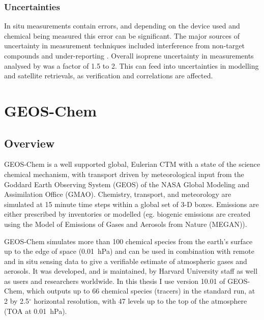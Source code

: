     
    \subsubsection{Uncertainties}
      \label{Model:Datasets:uncertainties}
      
      In situ measurements contain errors, and depending on the device used and chemical being measured this error can be significant.
      The major sources of uncertainty in measurement techniques included interference from non-target compounds and under-reporting \parencite[eg.][]{Dunne2018,Guerette2018}.
      Overall isoprene uncertainty in measurements analysed by \textcite{Dunne2018} was a factor of 1.5 to 2.
      This can feed into uncertainties in modelling and satellite retrievals, as verification and correlations are affected.
    
\section{GEOS-Chem}
  \label{Model:GC}

  \subsection{Overview}
    GEOS-Chem is a well supported global, Eulerian CTM with a state of the science chemical mechanism, with transport driven by meteorological input from the Goddard Earth Observing System (GEOS) of the NASA Global Modeling and Assimilation Office (GMAO).
    Chemistry, transport, and meteorology are simulated at 15 minute time steps within a global set of 3-D boxes.
    Emissions are either prescribed by inventories or modelled (eg. biogenic emissions are created using the Model of Emissions of Gases and Aerosols from Nature (MEGAN)).
    
    GEOS-Chem simulates more than 100 chemical species from the earth's surface up to the edge of space (0.01~hPa) and can be used in combination with remote and in situ sensing data to give a verifiable estimate of atmospheric gases and aerosols.
    It was developed, and is maintained, by Harvard University staff as well as users and researchers worldwide.
    In this thesis I use version 10.01 of GEOS-Chem, which outputs up to 66 chemical species (tracers) in the standard run, at 2 by 2.5$^{\circ}$ horizontal resolution, with 47 levels up to the top of the atmosphere (TOA at 0.01~hPa). 
    

